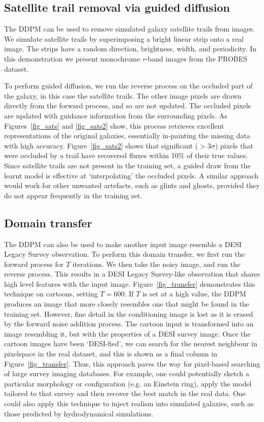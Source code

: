 \documentclass[fleqn,usenatbib]{mnras}
\begin{document}
\subsection{Satellite trail removal via guided diffusion}

The DDPM can be used to remove simulated galaxy satellite trails from images.
We simulate satellite trails by superimposing a bright linear strip onto a real
image. The strips have a random direction, brightness, width, and periodicity.
In this demonstration we present monochrome {\it r}-band images from the PROBES
dataset.

To perform guided diffusion, we run the reverse process on the occluded part of
the galaxy, in this case the satellite trails. The other image pixels are drawn
directly from the forward process, and so are not updated. The occluded pixels 
are updated with guidance information from the surrounding pixels. 
As Figures~\ref{fig_sats} and \ref{fig_sats2} show, this process
retrieves excellent representations of the original galaxies, essentially
in-painting the missing data with high accuracy. Figure~\ref{fig_sats2} shows
that significant ($>$3$\sigma$) pixels that were occluded by a trail have
recovered fluxes within 10\% of their true values. Since satellite trails are
not present in the training set, a guided draw from the learnt model is
effective at `interpolating' the occluded pixels. A similar approach would work
for other unwanted artefacts, such as glints and ghosts, provided they do not
appear frequently in the training set.

\subsection{Domain transfer} \label{sec_domaintransfer}

The DDPM can also be used to make another input image resemble a DESI Legacy
Survey observation. To perform this domain transfer, we first run the forward
process for $T$ iterations. We then take the noisy image, and run the reverse
process.  This results in a DESI Legacy Survey-like observation that shares
high level features with the input image. Figure~\ref{fig_transfer}
demonstrates this technique on cartoons, setting $T = 600$.  If $T$ is set at a
high value, the DDPM produces an image that more closely resembles one that
might be found in the training set. However, fine detail in the conditioning
image is lost as it is erased by the forward noise addition process.  The
cartoon input is transformed into an image resembling it, but with the
properties of a DESI survey image. Once the cartoon images have been
`DESI-fied', we can search for the nearest neighbour in pixelspace in the real
dataset, and this is shown as a final column in Figure~\ref{fig_transfer}.
Thus, this approach paves the way for pixel-based searching of large survey
imaging databases. For example, one could potentially sketch a particular
morphology or configuration (e.g. an Einstein ring), apply the model tailored
to that survey and then recover the best match in the real data. One could also
apply this technique to inject realism into simulated galaxies, such as those
predicted by hydrodynamical simulations. 
\end{document}
